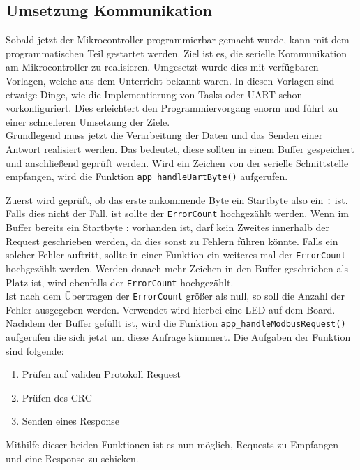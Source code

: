 \subsection{Umsetzung Kommunikation} \label{ssec:konzeptCardDeal}
Sobald jetzt der Mikrocontroller programmierbar gemacht wurde, kann mit dem programmatischen Teil gestartet werden.
Ziel ist es, die serielle Kommunikation am Mikrocontroller zu realisieren.
Umgesetzt wurde dies mit verfügbaren Vorlagen, welche aus dem Unterricht bekannt waren.
In diesen Vorlagen sind etwaige Dinge, wie die Implementierung von Tasks oder UART schon vorkonfiguriert.
Dies erleichtert den Programmiervorgang enorm und führt zu einer schnelleren Umsetzung der Ziele.\\
Grundlegend muss jetzt die Verarbeitung der Daten und das Senden einer Antwort realisiert werden.
Das bedeutet, diese sollten in einem Buffer gespeichert und anschließend geprüft werden.
Wird ein Zeichen von der serielle Schnittstelle empfangen, wird die Funktion \lstinline[style=C]{app_handleUartByte()} aufgerufen.

Zuerst wird geprüft, ob das erste ankommende Byte ein Startbyte also ein \lstinline[style=C]{:} ist.
Falls dies nicht der Fall, ist sollte der \lstinline[style=C]{ErrorCount} hochgezählt werden.
Wenn im Buffer bereits ein Startbyte : vorhanden ist, darf kein Zweites innerhalb der Request geschrieben werden, da dies sonst zu Fehlern führen könnte.
Falls ein solcher Fehler auftritt, sollte in einer Funktion ein weiteres mal der \lstinline[style=C]{ErrorCount} hochgezählt werden.
Werden danach mehr Zeichen in den Buffer geschrieben als Platz ist, wird ebenfalls der \lstinline[style=C]{ErrorCount} hochgezählt.\\
Ist nach dem Übertragen der \lstinline[style=C]{ErrorCount} größer als null, so soll die Anzahl der Fehler ausgegeben werden.
Verwendet wird hierbei eine LED auf dem Board.\\
Nachdem der Buffer gefüllt ist, wird die Funktion \lstinline[style=C]{app_handleModbusRequest()} aufgerufen die sich jetzt um diese Anfrage kümmert.
Die Aufgaben der Funktion sind folgende:
\begin{enumerate}
\item Prüfen auf validen Protokoll Request
\item Prüfen des CRC
\item Senden eines Response
\end{enumerate}
Mithilfe dieser beiden Funktionen ist es nun möglich, Requests zu Empfangen und eine Response zu schicken.
\newpage
